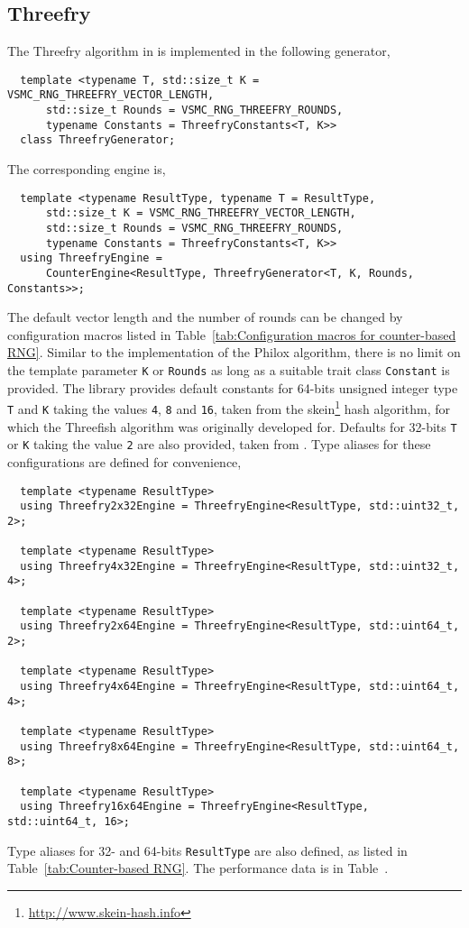 \subsection{Threefry}
\label{sub:Threefry}

The Threefry algorithm in \textcite{Salmon:2011um} is implemented in the
following generator,
\begin{Verbatim}
  template <typename T, std::size_t K = VSMC_RNG_THREEFRY_VECTOR_LENGTH,
      std::size_t Rounds = VSMC_RNG_THREEFRY_ROUNDS,
      typename Constants = ThreefryConstants<T, K>>
  class ThreefryGenerator;
\end{Verbatim}
The corresponding \rng engine is,
\begin{Verbatim}
  template <typename ResultType, typename T = ResultType,
      std::size_t K = VSMC_RNG_THREEFRY_VECTOR_LENGTH,
      std::size_t Rounds = VSMC_RNG_THREEFRY_ROUNDS,
      typename Constants = ThreefryConstants<T, K>>
  using ThreefryEngine =
      CounterEngine<ResultType, ThreefryGenerator<T, K, Rounds, Constants>>;
\end{Verbatim}
The default vector length and the number of rounds can be changed by
configuration macros listed in Table~\ref{tab:Configuration macros for
  counter-based RNG}. Similar to the implementation of the Philox algorithm,
there is no limit on the template parameter \verb|K| or \verb|Rounds| as long
as a suitable trait class \verb|Constant| is provided. The library provides
default constants for 64-bits unsigned integer type \verb|T| and \verb|K|
taking the values \verb|4|, \verb|8| and \verb|16|, taken from the
skein\footnote{\url{http://www.skein-hash.info}} hash algorithm, for which the
Threefish algorithm was originally developed for. Defaults for 32-bits \verb|T|
or \verb|K| taking the value \verb|2| are also provided, taken from
\textcite{Salmon:2011um}. Type aliases for these configurations are defined for
convenience,
\begin{Verbatim}
  template <typename ResultType>
  using Threefry2x32Engine = ThreefryEngine<ResultType, std::uint32_t, 2>;

  template <typename ResultType>
  using Threefry4x32Engine = ThreefryEngine<ResultType, std::uint32_t, 4>;

  template <typename ResultType>
  using Threefry2x64Engine = ThreefryEngine<ResultType, std::uint64_t, 2>;

  template <typename ResultType>
  using Threefry4x64Engine = ThreefryEngine<ResultType, std::uint64_t, 4>;

  template <typename ResultType>
  using Threefry8x64Engine = ThreefryEngine<ResultType, std::uint64_t, 8>;

  template <typename ResultType>
  using Threefry16x64Engine = ThreefryEngine<ResultType, std::uint64_t, 16>;
\end{Verbatim}
Type aliases for 32- and 64-bits \verb|ResultType| are also defined, as listed
in Table~\ref{tab:Counter-based RNG}. The performance data is in
Table~.


